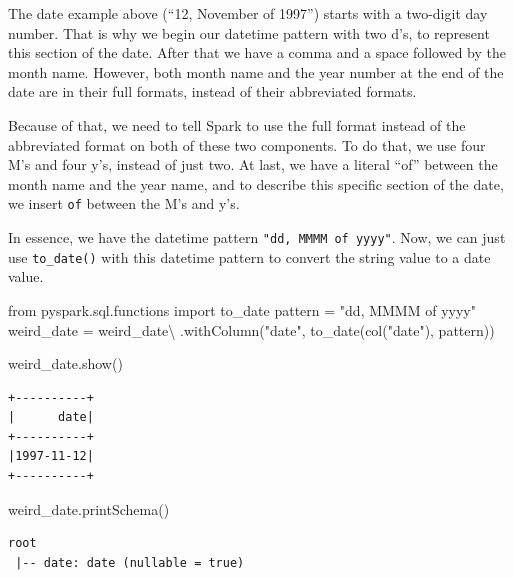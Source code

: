 \documentclass[
  11pt,
  letterpaper,
  DIV=11,
  numbers=noendperiod]{scrreprt}
\newenvironment{Shaded}{\begin{snugshade}}{\end{snugshade}}
\newcommand{\ImportTok}[1]{\textcolor[rgb]{0.00,0.46,0.62}{#1}}
\newcommand{\NormalTok}[1]{\textcolor[rgb]{0.00,0.23,0.31}{#1}}
\newcommand{\OperatorTok}[1]{\textcolor[rgb]{0.37,0.37,0.37}{#1}}
\newcommand{\StringTok}[1]{\textcolor[rgb]{0.13,0.47,0.30}{#1}}
\begin{document}
The date example above (``12, November of 1997'') starts with a
two-digit day number. That is why we begin our datetime pattern with two
d's, to represent this section of the date. After that we have a comma
and a space followed by the month name. However, both month name and the
year number at the end of the date are in their full formats, instead of
their abbreviated formats.

Because of that, we need to tell Spark to use the full format instead of
the abbreviated format on both of these two components. To do that, we
use four M's and four y's, instead of just two. At last, we have a
literal ``of'' between the month name and the year name, and to describe
this specific section of the date, we insert
\texttt{\textquotesingle{}of\textquotesingle{}} between the M's and y's.

In essence, we have the datetime pattern
\texttt{"dd,\ MMMM\ \textquotesingle{}of\textquotesingle{}\ yyyy"}. Now,
we can just use \texttt{to\_date()} with this datetime pattern to
convert the string value to a date value.

\begin{Shaded}
\begin{Highlighting}[]
\ImportTok{from}\NormalTok{ pyspark.sql.functions }\ImportTok{import}\NormalTok{ to\_date}
\NormalTok{pattern }\OperatorTok{=} \StringTok{"dd, MMMM \textquotesingle{}of\textquotesingle{} yyyy"}
\NormalTok{weird\_date }\OperatorTok{=}\NormalTok{ weird\_date}\OperatorTok{\textbackslash{}}
\NormalTok{    .withColumn(}\StringTok{"date"}\NormalTok{, to\_date(col(}\StringTok{"date"}\NormalTok{), pattern))}

\NormalTok{weird\_date.show()}
\end{Highlighting}
\end{Shaded}

\begin{verbatim}
+----------+
|      date|
+----------+
|1997-11-12|
+----------+
\end{verbatim}

\begin{Shaded}
\begin{Highlighting}[]
\NormalTok{weird\_date.printSchema()}
\end{Highlighting}
\end{Shaded}

\begin{verbatim}
root
 |-- date: date (nullable = true)
\end{verbatim}
\end{document}
